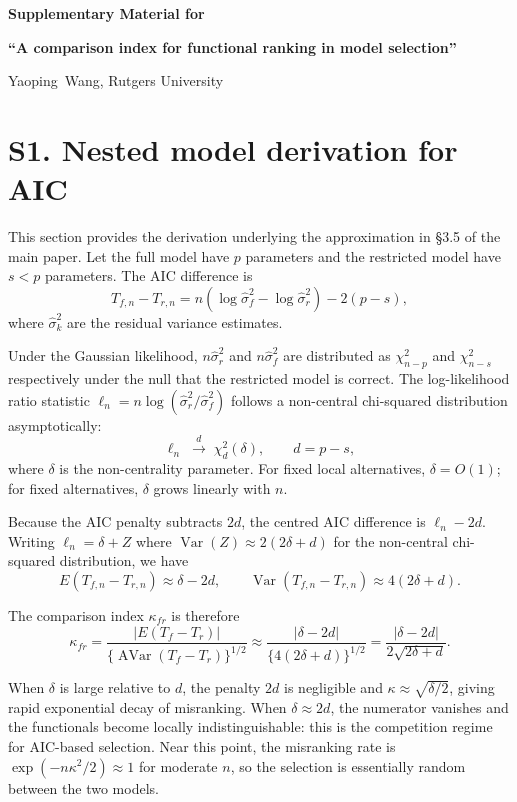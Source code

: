\documentclass[11pt]{article}
\DeclareMathOperator{\Var}{Var}
\DeclareMathOperator{\AVar}{AVar}
\begin{document}
\centerline{\bf\large Supplementary Material for}
\vspace{2mm}
\centerline{\bf\large ``A comparison index for functional ranking in model selection''}
\vspace{2mm}
\centerline{Yaoping~Wang, Rutgers University}
\vspace{5mm}

\section*{S1.  Nested model derivation for AIC}
\label{sec:aic-detail}

This section provides the derivation underlying the approximation in \S3.5 of the main paper.  Let the full model have $p$ parameters and the restricted model have $s<p$ parameters.  The AIC difference is
\[
T_{f,n} - T_{r,n} = n(\log\hat\sigma_f^2 - \log\hat\sigma_r^2) - 2(p-s),
\]
where $\hat\sigma_k^2$ are the residual variance estimates.

Under the Gaussian likelihood, $n\hat\sigma_r^2$ and $n\hat\sigma_f^2$ are distributed as $\chi^2_{n-p}$ and $\chi^2_{n-s}$ respectively under the null that the restricted model is correct.  The log-likelihood ratio statistic $\ell_n = n\log(\hat\sigma_r^2/\hat\sigma_f^2)$ follows a non-central chi-squared distribution asymptotically:
\[
\ell_n \;\xrightarrow{d}\; \chi^2_{d}(\delta), \qquad d = p-s,
\]
where $\delta$ is the non-centrality parameter.  For fixed local alternatives, $\delta = O(1)$; for fixed alternatives, $\delta$ grows linearly with $n$.

Because the AIC penalty subtracts $2d$, the centred AIC difference is $\ell_n - 2d$.  Writing $\ell_n = \delta + Z$ where $\Var(Z) \approx 2(2\delta + d)$ for the non-central chi-squared distribution, we have
\[
E(T_{f,n} - T_{r,n}) \approx \delta - 2d, \qquad
\Var(T_{f,n} - T_{r,n}) \approx 4(2\delta + d).
\]

The comparison index $\kappa_{fr}$ is therefore
\[
\kappa_{fr} = \frac{|E(T_f - T_r)|}{\{\AVar(T_f - T_r)\}^{1/2}}
           \approx \frac{|\delta - 2d|}{\{4(2\delta + d)\}^{1/2}}
           = \frac{|\delta - 2d|}{2\sqrt{2\delta + d}}.
\]

When $\delta$ is large relative to $d$, the penalty $2d$ is negligible and $\kappa \approx \sqrt{\delta/2}$, giving rapid exponential decay of misranking.  When $\delta \approx 2d$, the numerator vanishes and the functionals become locally indistinguishable: this is the competition regime for AIC-based selection.  Near this point, the misranking rate is $\exp(-n\kappa^2/2) \approx 1$ for moderate $n$, so the selection is essentially random between the two models.
\end{document}
